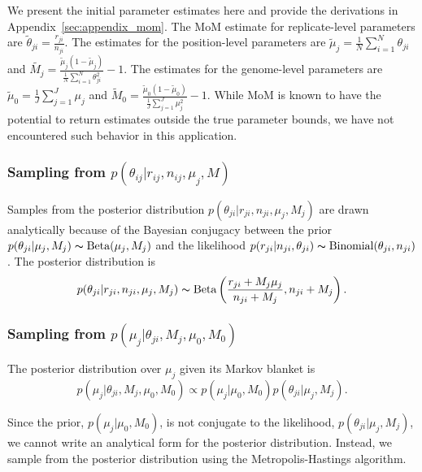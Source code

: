 \documentclass[11pt,reqno]{amsart}
\begin{document}
We present the initial parameter estimates here and provide the derivations in Appendix~\ref{sec:appendix_mom}. The MoM estimate for replicate-level parameters are
$\tilde{\theta}_{ji} = \frac{r_{ji}} {n_{ji}}$.
The estimates for the position-level parameters are
$\tilde{\mu}_j = \frac{1}{N} \sum_{i=1}^N \theta_{ji}$
and
$\tilde{M_j} = \frac{ \tilde{\mu}_j (1 - \tilde{\mu}_j ) } { \frac{1}{N} \sum_{i=1}^N \theta_{ji}^2 } -1$.
The estimates for the genome-level parameters are
$\tilde{\mu}_0 = \frac{1}{J} \sum_{j=1}^J \mu_j$
and
$\tilde{M}_0 = \frac{ \tilde{\mu}_0 (1 - \tilde{\mu}_0 ) } {\frac{1}{J} \sum_{j=1}^J \mu_j^2 } -1$.
While MoM is known to have the potential to return estimates outside the true parameter bounds, we have not encountered such behavior in this application.

\subsubsection{Sampling from $p \left( \theta_{ij} |r_{ij},n_{ij},\mu_j,M \right)$}

Samples from the posterior distribution
$p(\theta_{ji} | r_{ji}, n_{ji}, \mu_j, M_j)$
are drawn analytically because of the Bayesian conjugacy between the prior
$p(\theta_{ji} | \mu_j, M_j) \thicksim \text{Beta}(\mu_j, M_j)$
and the likelihood
$p(r_{ji} | n_{ji}, \theta_{ji}) \thicksim \text{Binomial}(\theta_{ji}, n_{ji})$.
The posterior distribution is
\begin{equation}
	p(\theta_{ji} | r_{ji}, n_{ji}, \mu_j, M_j) \thicksim \text{Beta}\left( \frac{r_{ji} + M_j \mu_j}{n_{ji} + M_j} , n_{ji} + M_j\right).
\end{equation}

\subsubsection{Sampling from $p \left( \mu_j |\theta_{ji},M_j,\mu_0,M_0\right)$}
The posterior distribution over $\mu_j$ given its Markov blanket is
\begin{equation}
	p( \mu_j | \theta_{ji}, M_j, \mu_0, M_0 ) \propto p(\mu_j | \mu_0, M_0) p(\theta_{ji} | \mu_j, M_j).
\end{equation}

Since the prior, $p(\mu_j | \mu_0, M_0)$, is not conjugate to the likelihood, $p(\theta_{ji} | \mu_j, M_j)$, we cannot write an analytical form for the posterior distribution. Instead, we sample from the posterior distribution using the Metropolis-Hastings algorithm.
\end{document}
